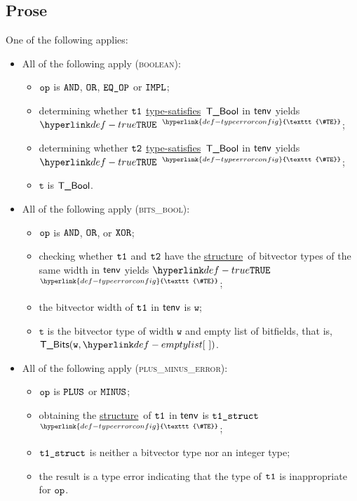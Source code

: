 \documentclass{book}
\newcommand\TypeErrorConfig[0]{\hyperlink{def-typeerrorconfig}{\texttt{\#TE}}}
\newcommand\ProseOrTypeError[0]{\hyperlink{def-proseortypeerror}{$^{\TypeErrorConfig}$}}
\newcommand\structure[0]{\hyperlink{def-structure}{structure}}
\newcommand\typesatisfies[0]{\hyperlink{def-typesatisfies}{type-satisfies}}
\newcommand\vt[0]{\texttt{t}}
\newcommand\vw[0]{\texttt{w}}
\begin{document}
\subsection{Prose}
One of the following applies:
\begin{itemize}
  \item All of the following apply (\textsc{boolean}):
  \begin{itemize}
    \item $\texttt{op}$ is $\texttt{AND}$, $\texttt{OR}$, $\texttt{EQ\_OP}$ or $\texttt{IMPL}$;
    \item determining whether $\texttt{t1}$ \typesatisfies\ $\textsf{T\_Bool}$ in $\textsf{tenv}$ yields $\True$ \ProseOrTypeError;
    \item determining whether $\texttt{t2}$ \typesatisfies\ $\textsf{T\_Bool}$ in $\textsf{tenv}$ yields $\True$ \ProseOrTypeError;
    \item $\vt$ is $\textsf{T\_Bool}$.
  \end{itemize}

  \item All of the following apply (\textsc{bits\_bool}):
  \begin{itemize}
    \item $\texttt{op}$ is $\texttt{AND}$, $\texttt{OR}$, or $\texttt{XOR}$;
    \item checking whether $\texttt{t1}$ and $\texttt{t2}$ have the \structure\ of bitvector types
          of the same width in $\textsf{tenv}$ yields $\True$ \ProseOrTypeError;
    \item the bitvector width of $\texttt{t1}$ in $\textsf{tenv}$ is $\vw$;
    \item $\vt$ is the bitvector type of width $\vw$ and empty list of bitfields, that is, \\ $\TBits(\vw, \emptylist)$.
  \end{itemize}

  \item All of the following apply (\textsc{plus\_minus\_error}):
  \begin{itemize}
    \item $\texttt{op}$ is $\texttt{PLUS}$ or $\texttt{MINUS}$;
    \item obtaining the \structure\ of $\texttt{t1}$ in $\textsf{tenv}$ is $\texttt{t1\_struct}$ \ProseOrTypeError;
    \item $\texttt{t1\_struct}$ is neither a bitvector type nor an integer type;
    \item the result is a type error indicating that the type of $\texttt{t1}$ is inappropriate for $\texttt{op}$.
  \end{itemize}


\end{itemize}
\end{document}
